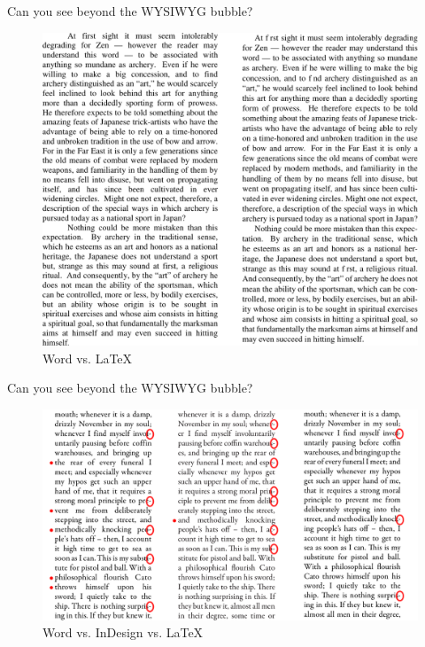 \documentclass[10pt,times]{beamer}
\begin{document}
\begin{frame}{Can you see beyond the WYSIWYG bubble?}
  \begin{figure}
    \centering
    \includegraphics[height=0.8\textheight]{figs/LaTeX_Word.pdf}
    \caption*{Word vs. \LaTeX}
\end{figure}
\end{frame}

\begin{frame}{Can you see beyond the WYSIWYG bubble?}
  \begin{figure}
    \centering
    \includegraphics[width=\linewidth]{figs/LaTeX_InDesign_Word.png}
    \caption*{Word vs. InDesign vs. \LaTeX}
\end{figure}
\end{frame}
\end{document}
